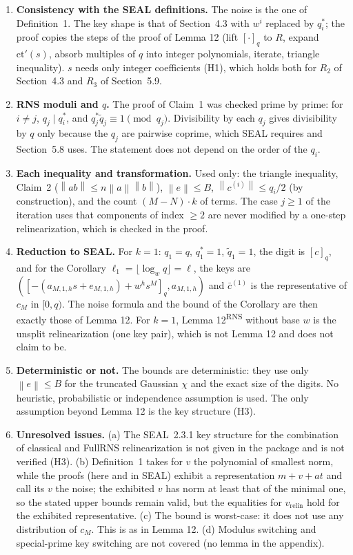 \documentclass[11pt]{article}
\newcommand{\norm}[1]{\left\lVert #1\right\rVert}
\newcommand{\ct}{\mathrm{ct}}
\newcommand{\vrelin}{v_{\mathrm{relin}}}
\newcommand{\qstar}[1]{q^{*}_{#1}}
\newcommand{\qtilde}[1]{\tilde{q}_{#1}}
\theoremstyle{plain}
\theoremstyle{definition}
\theoremstyle{remark}
\begin{document}
\begin{enumerate}[leftmargin=2em]
\item \textbf{Consistency with the SEAL definitions.} The noise is the one of Definition~1. The key shape is that of
      Section~4.3 with $w^i$ replaced by $\qstar{i}$; the proof copies the steps of the proof of Lemma 12
      (lift $[\cdot]_q$ to $R$, expand $\ct'(s)$, absorb multiples of $q$ into integer polynomials, iterate,
      triangle inequality). $s$ needs only integer coefficients (H1), which holds both for $R_2$ of
      Section~4.3 and $R_3$ of Section~5.9.
\item \textbf{RNS moduli and $q$.} The proof of Claim~1 was checked prime by prime: for $i\neq j$,
      $q_j\mid\qstar{i}$, and $\qstar{j}\qtilde{j}\equiv1\pmod{q_j}$. Divisibility by each $q_j$ gives
      divisibility by $q$ only because the $q_j$ are pairwise coprime, which SEAL requires and Section~5.8 uses.
      The statement does not depend on the order of the $q_i$.
\item \textbf{Each inequality and transformation.} Used only: the triangle inequality, Claim~2
      ($\norm{ab}\leq n\norm a\norm b$), $\norm{e}\leq B$, $\norm{c^{(i)}}\leq q_i/2$ (by construction), and the
      count $(M-N)\cdot k$ of terms. The case $j\geq1$ of the iteration uses that components of index $\geq2$
      are never modified by a one-step relinearization, which is checked in the proof.
\item \textbf{Reduction to SEAL.} For $k=1$: $q_1=q$, $\qstar{1}=1$, $\qtilde{1}=1$, the digit is $[c]_q$, and for the
      Corollary $\ell_1=\lfloor\log_wq\rfloor=\ell$, the keys are $([-(a_{M,1,h}s+e_{M,1,h})+w^hs^M]_q,a_{M,1,h})$
      and $\bar c^{(1)}$ is the representative of $c_M$ in $[0,q)$. The noise formula and the bound of the Corollary
      are then exactly those of Lemma 12. For $k=1$, Lemma 12\textsuperscript{RNS} without base $w$ is the unsplit
      relinearization (one key pair), which is not Lemma 12 and does not claim to be.
\item \textbf{Deterministic or not.} The bounds are deterministic: they use only $\norm{e}\leq B$ for the truncated
      Gaussian $\chi$ and the exact size of the digits. No heuristic, probabilistic or independence assumption is used.
      The only assumption beyond Lemma 12 is the key structure (H3).
\item \textbf{Unresolved issues.}
      (a) The SEAL~2.3.1 key structure for the combination of classical and FullRNS relinearization
      is not given in the package and is not verified (H3).
      (b) Definition~1 takes for $v$ the polynomial of smallest norm, while the proofs (here and in SEAL) exhibit a
      representation $m+v+at$ and call its $v$ the noise; the exhibited $v$ has norm at least that of the minimal one,
      so the stated upper bounds remain valid, but the equalities for $\vrelin$ hold for the exhibited representative.
      (c) The bound is worst-case: it does not use any distribution of $c_M$. This is as in Lemma 12.
      (d) Modulus switching and special-prime key switching are not covered (no lemma in the appendix).
\end{enumerate}
\end{document}
